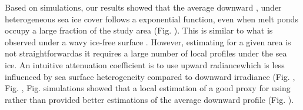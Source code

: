 Based on \DIFdelbegin {}\DIFdelend \DIFaddbegin {}\DIFaddend simulations, our results showed that the average downward \DIFdelbegin {}%
\DIFdelend \DIFaddbegin {}\meanedz{}\DIFaddend , under heterogeneous sea ice cover follows a \DIFdelbegin {}\DIFdelend \DIFaddbegin {}\DIFaddend exponential function, even when melt ponds occupy a large fraction of the study area (Fig. \DIFdelbegin {}\DIFdelend \DIFaddbegin {}\DIFaddend ). This is similar to what is observed under a wavy ice-free surface \citep{Zaneveld2001}. However, estimating \DIFdelbegin %
\DIFdelend \DIFaddbegin \meanedz{} \DIFaddend for a given area is not straightforward\DIFaddbegin \DIFadd{, }\DIFaddend as it requires a large number of local profiles under the sea ice. An intuitive \DIFdelbegin {}\DIFdelend \DIFaddbegin {}\DIFaddend attenuation coefficient is to use upward radiance\DIFaddbegin \DIFadd{, }\DIFaddend which is less influenced by sea surface heterogeneity compared to downward irradiance (Fig. \DIFdelbegin {}\DIFdelend \DIFaddbegin {}\DIFaddend , Fig. \DIFdelbegin {}\DIFdelend \DIFaddbegin {}\DIFaddend , Fig. \DIFdelbegin {}\DIFdelend \DIFaddbegin {}\DIFaddend simulations showed that a local estimation of \klu{} \DIFdelbegin {}\DIFdelend \DIFaddbegin {}\DIFaddend a good proxy for \meanked{} \DIFdelbegin {}%
\DIFdel{) }\DIFdelend \DIFaddbegin {}\DIFaddend using \klu{} rather than \ked{} provided better estimations of the average downward profile \DIFaddbegin {}\DIFaddend (Fig. \DIFdelbegin {}\DIFdelend \DIFaddbegin {}\DIFaddend ). 

